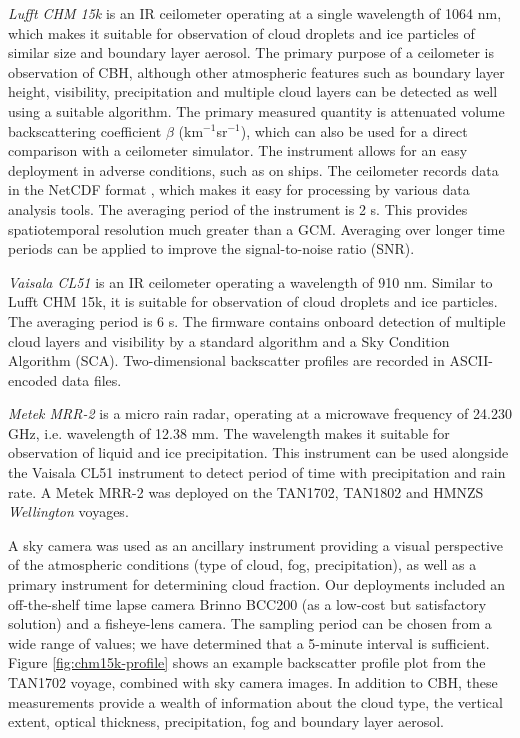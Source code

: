 \textit{Lufft CHM 15k} is an IR ceilometer operating at a single wavelength of
1064 nm, which makes it suitable for observation of cloud droplets and
ice particles of similar size and boundary layer aerosol.
The primary purpose of a ceilometer
is observation of CBH, although other atmospheric features
such as boundary layer height, visibility, precipitation and multiple
cloud layers can be detected as well using a suitable algorithm. The
primary measured quantity is attenuated volume backscattering coefficient
$\beta$ (km$^{-1}$sr$^{-1}$), which
can also be used for a direct comparison with a ceilometer simulator.
The instrument allows for an easy deployment
in adverse conditions, such as on ships.
The ceilometer records data in the NetCDF format \citep{rew2006},
which makes it easy
for processing by various data analysis tools.
The averaging period of the instrument is 2 s. This provides spatiotemporal
resolution much greater than a GCM. Averaging over longer time periods can be applied to improve the signal-to-noise ratio (SNR).

\textit{Vaisala CL51} is an IR ceilometer operating a
wavelength of 910 nm. Similar to Lufft CHM 15k, it is suitable for observation
of cloud droplets and ice particles. The averaging period is 6 s.
The firmware contains onboard detection of multiple cloud layers and
visibility by a standard algorithm and a Sky Condition Algorithm (SCA).
Two-dimensional backscatter profiles are recorded in ASCII-encoded data files.

\textit{Metek MRR-2} is a micro rain radar, operating at a microwave frequency of
24.230 GHz, i.e. wavelength of 12.38 mm. The wavelength makes it suitable
for observation of liquid and ice precipitation. This instrument can
be used alongside the Vaisala CL51 instrument to detect period of time with
precipitation and rain rate. A Metek MRR-2 was deployed on the TAN1702, TAN1802
and HMNZS \textit{Wellington} voyages.

A sky camera was used as an ancillary instrument providing a visual
perspective of the atmospheric conditions (type of cloud, fog,
precipitation), as well as a primary instrument for determining cloud fraction.
Our deployments included
an off-the-shelf time lapse camera Brinno BCC200 (as a low-cost but
satisfactory solution) and a fisheye-lens camera.
The sampling period can be chosen from a wide range of values; we have
determined that a 5-minute interval is sufficient.
Figure \ref{fig:chm15k-profile} shows an example backscatter profile plot
from the TAN1702 voyage, combined with sky camera images. 
In addition to CBH, these measurements provide a wealth
of information about the cloud type, the vertical extent, optical thickness,
precipitation, fog and boundary layer aerosol.

